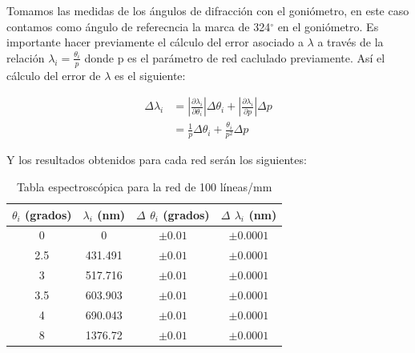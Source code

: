 \documentclass[11pt, a4paper, twocolumn]{article}
\begin{document}
Tomamos las medidas de los ángulos de difracción con el goniómetro, en este caso contamos como ángulo de referecncia la marca de 324$^\circ$ en el goniómetro. 
Es importante hacer previamente el cálculo del error asociado a $\lambda$ a través de la relación $\lambda_{i} = \frac{\theta_{i}}{p}$ donde p es el parámetro de red caclulado previamente. 
Así el cálculo del error de $\lambda$ es el siguiente:

\begin{align}
    \Delta \lambda_{i} & = \left|\frac{\partial \lambda_{i}}{\partial \theta_{i}}\right|\Delta \theta_{i} + \left|\frac{\partial \lambda_{i}}{\partial p}\right|\Delta p \\
    & = \frac{1}{p} \Delta \theta_{i} + \frac{\theta_{i}}{p^2} \Delta p
\end{align}

Y los resultados obtenidos para cada red serán los siguientes:

\begin{table}[H]
    \caption{Tabla espectroscópica para la red de 100 líneas/mm}
    \centering
    \small
    \setlength{\tabcolsep}{4pt}
    \begin{tabular}{cccc}
        \hline
        $\theta_{i}$ (grados) &   $\lambda_{i}$ (nm) &   $\Delta$ $\theta_{i}$ (grados) & $\Delta$ $\lambda_{i}$ (nm)   \\
        \hline
                    0   &          0     &                     $\pm 0.01$ & $ \pm 0.0001$            \\
                    2.5 &        431.491 &                     $\pm 0.01$ & $ \pm 0.0001$            \\
                    3   &        517.716 &                     $\pm 0.01$ & $ \pm 0.0001$            \\
                    3.5 &        603.903 &                     $\pm 0.01$ & $ \pm 0.0001$            \\
                    4   &        690.043 &                     $\pm 0.01$ & $ \pm 0.0001$            \\
                    8   &       1376.72  &                     $\pm 0.01$ & $ \pm 0.0001$            \\
        \hline
    \end{tabular}
\end{table}
\end{document}
